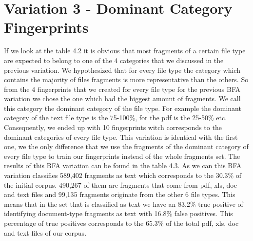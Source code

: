 


\section{Variation 3 - Dominant Category Fingerprints}
If we look at the table 4.2 it is obvious that most fragments of a certain file type are expected to belong to one of the 4 categories that we discussed in the previous variation. We hypothesized that for every file type the category which contains the majority of files  fragments is more representative than the others. So from the 4 fingerprints that we created for every file type for the previous BFA variation we chose the one which had the biggest amount of fragments. We call this category the dominant category of the file type. For example the dominant category of the text file type is the 75-100\%, for the pdf is the 25-50\% etc. Consequently, we ended up with 10 fingerprints witch corresponds to the dominant categories of every file type. This variation is identical with the first one, we the only difference that we use the fragments of the dominant category of every file type to train our fingerprints instead of the whole fragments set. The results of this BFA variation can be found in the table 4.3. As we can this BFA variation classifies 589,402 fragments as text which corresponds to the 30.3\% of the initial corpus. 490,267 of them are fragments that come from pdf, xls, doc and text files and 99,135 fragments originate from the other 6 file types. This means that in the set that is classified as text we have an 83.2\% true positive of identifying document-type fragments as text with 16.8\% false positives. This percentage of true positives corresponds to the 65.3\% of the total pdf, xls, doc and text files of our corpus.


